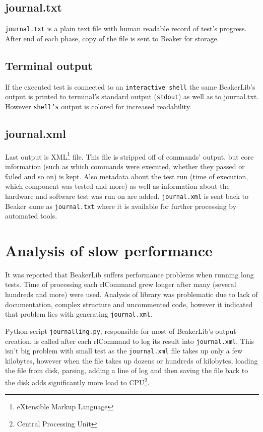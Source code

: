 \subsection{journal.txt}
\texttt{journal.txt} is a plain text file with human readable record of test's progress. After end of each phase, copy of the file is sent to Beaker for storage.
\subsection{Terminal output}
If the executed test is connected to an \texttt{interactive shell} the same BeakerLib's output is printed to terminal's standard output (\texttt{stdout}) as well as to journal.txt. However \texttt{shell's} output is colored for increased readability.  

\subsection{journal.xml}
Last output is XML\footnote{eXtensible Markup Language} file. This file is stripped off of commands' output, but core information (such as which commands were executed, whether they passed or failed and so on) is kept. Also metadata about the test run (time of execution, which component was tested and more) as well as information about the hardware and software test was run on are added. \texttt{journal.xml} is sent back to Beaker same as \texttt{journal.txt} where it is available for further processing by automated tools. 


\section{Analysis of slow performance}
It was reported that BeakerLib suffers performance problems when running long tests. Time of processing each rlCommand grew longer after many (several hundreds and more) were used. Analysis of library was problematic due to lack of documentation, complex structure and uncommented code, however it indicated that problem lies with generating \texttt{journal.xml}. 

Python script \texttt{journalling.py}, responsible for most of BeakerLib's output creation, is called after each rlCommand to log its result into \texttt{journal.xml}. This isn't big problem with small test as the \texttt{journal.xml} file takes up only a few kilobytes, however when the file takes up dozens or hundreds of kilobytes, loading the file from disk, parsing, adding a line of log and then saving the file back to the disk adds significantly more load to CPU\footnote{Central Processing Unit}. 

